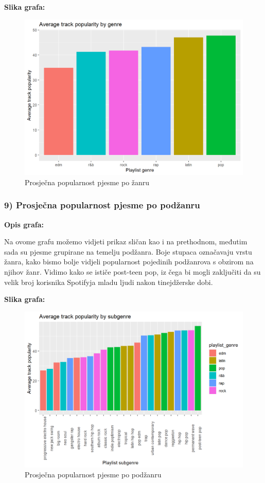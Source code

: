 	
	\textbf{Slika grafa:}
	\begin{figure}[H]
		\includegraphics[scale=0.9]{slike/genre.png}
		\centering
		\caption{ Prosječna popularnost pjesme po žanru}
		
	\end{figure}
	
	
	\subsubsection{9) Prosječna popularnost pjesme po podžanru}
	
	\textbf{Opis grafa:}
	
	Na ovome grafu možemo vidjeti prikaz sličan kao i na prethodnom, međutim sada su pjesme grupirane na temelju podžanra. Boje stupaca označavaju vrstu žanra, kako bismo bolje vidjeli popularnost pojedinih podžanrova s obzirom na njihov žanr.
	Vidimo kako se ističe post-teen pop, iz čega bi mogli zaključiti da su velik broj korisnika Spotifyja mladu ljudi nakon tinejdžerske dobi.
	
	\textbf{Slika grafa:}
	\begin{figure}[H]
		\includegraphics[scale=0.9]{slike/subgenre.png}
		\centering
		\caption{Prosječna popularnost pjesme po podžanru}
		
	\end{figure}


